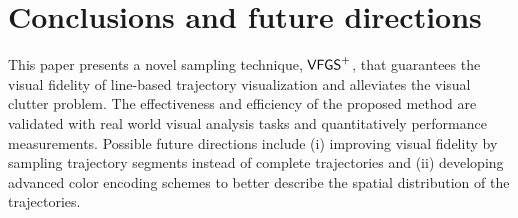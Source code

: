 \section{Conclusions and future directions}\label{sec:con}
This paper presents a novel sampling technique, $\mathsf{VFGS}^{+}$, that guarantees the visual fidelity of line-based trajectory visualization and alleviates the visual clutter problem. The effectiveness and efficiency of the proposed method are validated with real world visual analysis tasks and quantitatively performance measurements. Possible future directions include (i) improving visual fidelity by sampling trajectory segments instead of complete trajectories and (ii) developing advanced color encoding schemes to better describe the spatial distribution of the trajectories.

